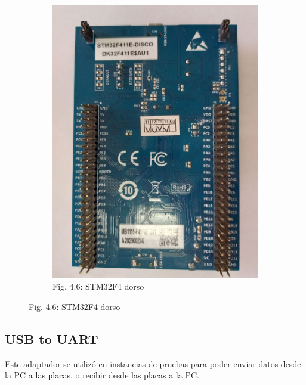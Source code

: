 \documentclass[12pt]{article}
\begin{document}
\begin{figure}[ht]
\begin{subfigure}[b]{0.45\linewidth}
    \includegraphics[width=\linewidth]{images/STM32F4-2.jpg}
    \caption{Fig. 4.6: STM32F4 dorso}
  \end{subfigure}
\end{figure}


\subsection*{USB to UART}
Este adaptador se utilizó en instancias de pruebas para poder enviar datos desde la PC a las placas, o recibir desde las placas a la PC.
\end{document}
